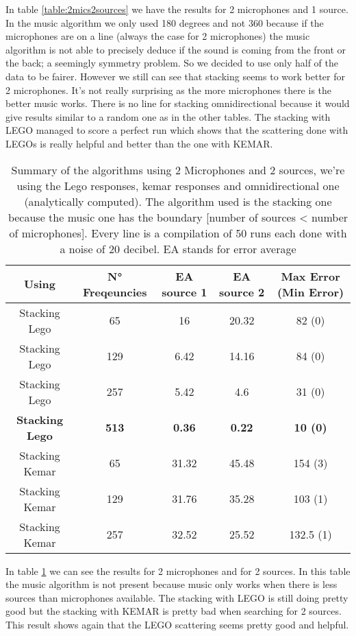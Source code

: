 In table \ref{table:2mics2sources} we have the results for 2 microphones and 1 source. In the music algorithm we only used 180 degrees and not 360 because if the microphones are on a line (always the case for 2 microphones) the music algorithm is not able to precisely deduce if the sound is coming from the front or the back; a seemingly symmetry problem. So we decided to use only half of the data to be fairer.
However we still can see that stacking seems to work better for 2 microphones. It's not really surprising as the more microphones there is the better music works. There is no line for stacking omnidirectional because it would give results similar to a random one as in the other tables. The stacking with LEGO managed to score a perfect run which shows that the scattering done with LEGOs is really helpful and better than the one with KEMAR. 

\begin{table}[H]
   \centering
    \begin{tabular}{|c|c|c|c|c|}
      \hline
      Using & N° Freqeuncies & EA source 1 & EA source 2 & Max Error (Min Error) \\
      \hline
      Stacking Lego & 65 & 16 & 20.32 & 82 (0) \\
      Stacking Lego & 129 & 6.42 & 14.16 & 84 (0) \\
      Stacking Lego & 257 & 5.42 & 4.6 & 31 (0) \\
      \textbf{Stacking Lego} & \textbf{513} & \textbf{0.36}& \textbf{0.22} & \textbf{10 (0)} \\

      Stacking Kemar & 65 & 31.32 & 45.48 & 154 (3) \\
      Stacking Kemar & 129 & 31.76 & 35.28 & 103 (1) \\
      Stacking Kemar & 257 & 32.52 & 25.52 & 132.5 (1) \\
      \hline
    \end{tabular}
    \caption{Summary of the algorithms using 2 Microphones and 2 sources, we're using the Lego responses, kemar responses and omnidirectional one (analytically computed). The algorithm used is the stacking one because the music one has the boundary [number of sources < number of microphones]. Every line is a compilation of 50 runs each done with a noise of 20 decibel. EA stands for error average}
    \label{table:2mic2sources}
\end{table}

In table \ref{table:2mic2sources} we can see the results for 2 microphones and for 2 sources. In this table the music algorithm is not present because music only works when there is less sources than microphones available. The stacking with LEGO is still doing pretty good but the stacking with KEMAR is pretty bad when searching for 2 sources. This result shows again that the LEGO scattering seems pretty good and helpful. 


